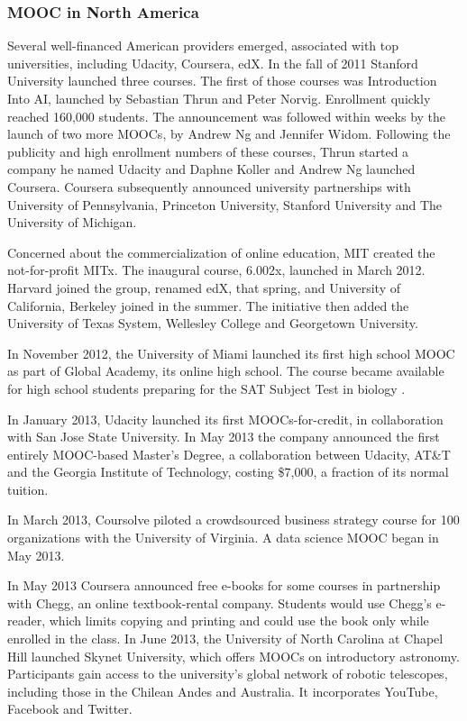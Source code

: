 \subsubsection{MOOC in North America}
Several well-financed American providers emerged, associated with top
universities, including Udacity, Coursera, edX.
In the fall of 2011 Stanford University launched three courses. The first of
those courses was Introduction Into AI, launched by Sebastian Thrun and Peter
Norvig. Enrollment quickly reached 160,000 students. The announcement was
followed within weeks by the launch of two more MOOCs, by Andrew Ng and Jennifer
Widom. Following the publicity and high enrollment numbers of these courses,
Thrun started a company he named Udacity and Daphne Koller and Andrew Ng
launched Coursera. Coursera subsequently announced university partnerships with
University of Pennsylvania, Princeton University, Stanford University and The
University of Michigan.

Concerned about the commercialization of online education, MIT created the
not-for-profit MITx. The inaugural course, 6.002x, launched in March 2012.
Harvard joined the group, renamed edX, that spring, and University of
California, Berkeley joined in the summer. The initiative then added the
University of Texas System, Wellesley College and Georgetown University.

In November 2012, the University of Miami launched its first high school MOOC as
part of Global Academy, its online high school. The course became available for
high school students preparing for the SAT Subject Test in biology \citep{history_of_a_revolution}.

In January 2013, Udacity launched its first MOOCs-for-credit, in collaboration
with San Jose State University. In May 2013 the company announced the first
entirely MOOC-based Master's Degree, a collaboration between Udacity, AT\&T and
the Georgia Institute of Technology, costing \$7,000, a fraction of its normal
tuition.

In March 2013, Coursolve piloted a crowdsourced business strategy course for 100
organizations with the University of Virginia. A data science MOOC began in
May 2013.

In May 2013 Coursera announced free e-books for some courses in partnership with
Chegg, an online textbook-rental company. Students would use Chegg's e-reader,
which limits copying and printing and could use the book only while enrolled in
the class. In June 2013, the University of North Carolina at Chapel Hill
launched Skynet University, which offers MOOCs on introductory astronomy.
Participants gain access to the university's global network of robotic
telescopes, including those in the Chilean Andes and Australia. It incorporates
YouTube, Facebook and Twitter.

